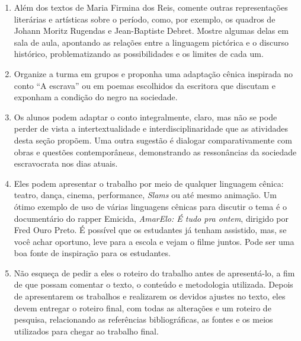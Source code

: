 \documentclass[12pt]{extarticle}
\begin{document}
\begin{enumerate}
\item
Além dos textos de Maria Firmina dos Reis,
comente outras representações literárias e artísticas sobre o período,
como, por exemplo, os quadros de Johann Moritz Rugendas e Jean-Baptiste
Debret. Mostre algumas delas em sala de aula, apontando as relações
entre a linguagem pictórica e o discurso histórico, problematizando as
possibilidades e os limites de cada um.






\item
Organize a turma em grupos e proponha uma adaptação cênica inspirada
no conto ``A escrava'' ou em poemas escolhidos da escritora que discutam
e exponham a condição do negro na sociedade.

\item
Os alunos podem adaptar o conto integralmente, claro, mas não se pode
perder de vista a intertextualidade e interdisciplinaridade que as
atividades desta seção propõem. Uma outra sugestão é dialogar
comparativamente com obras e questões contemporâneas, demonstrando as
ressonâncias da sociedade escravocrata nos dias atuais.

\item
Eles podem apresentar o trabalho por meio de qualquer linguagem
cênica: teatro, dança, cinema, performance, \emph{Slams} ou até mesmo
animação. Um ótimo exemplo de uso de várias linguagens cênicas para
discutir o tema é o documentário do rapper Emicida, \emph{AmarElo: É
tudo pra ontem}, dirigido por Fred Ouro Preto. É possível que os
estudantes já tenham assistido, mas, se você achar oportuno, leve para a
escola e vejam o filme juntos. Pode ser uma boa fonte de inspiração para
os estudantes.

\item
Não esqueça de pedir a eles o roteiro do trabalho antes de
apresentá-lo, a fim de que possam comentar o texto, o conteúdo e
metodologia utilizada. Depois de apresentarem os trabalhos e realizarem
os devidos ajustes no texto, eles devem entregar o roteiro final, com
todas as alterações e um roteiro de pesquisa, relacionando as
referências bibliográficas, as fontes e os meios utilizados para chegar
ao trabalho final.
\end{enumerate}
\end{document}
